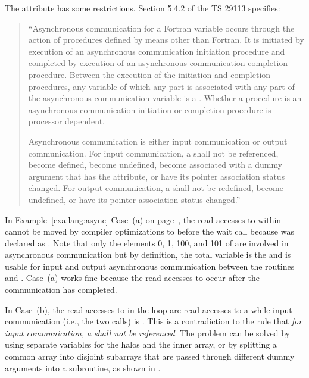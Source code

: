 The  attribute has some restrictions.
Section 5.4.2 of the TS 29113 specifies:
\begin{quote}
``Asynchronous communication for a Fortran variable occurs through the action of procedures defined by means
other than Fortran. It is initiated by execution of an asynchronous communication initiation procedure and
completed by execution of an asynchronous communication completion procedure. Between the execution of the
initiation and completion procedures, any variable of which any part is associated with any part of the
asynchronous communication variable is a . Whether a procedure is an asynchronous
communication initiation or completion procedure is processor dependent.

Asynchronous communication is either input communication or output communication. For input communication,
a  shall not be referenced, become defined, become undefined, become associated
with a dummy argument that has the  attribute, or have its pointer association status changed. For
output communication, a  shall not be redefined, become undefined, or have its
pointer association status changed.''
\end{quote}

In Example~\ref{exa:lang:async} Case~(a) on page~\pageref{exa:lang:async},
the read accesses to  within 
cannot be moved by compiler optimizations to before the wait call
because  was declared as .
Note that only the elements 0, 1, 100, and 101 of  are
involved in asynchronous communication but by definition,
the total variable  is the 
and is usable for input and output asynchronous communication
between the  routines and .
Case~(a) works fine because the read accesses to 
occur after the communication has completed.

In Case~(b), the read accesses to  in the loop 
are read accesses to a  while
input communication (i.e., the two  calls)
is .
This is a contradiction to the rule that
\emph{for input communication, a}
\emph{shall not be referenced}.
The problem can be solved by using separate variables for the halos
and the inner array,
or by splitting a common array into disjoint subarrays that are
passed through different dummy arguments into a subroutine, as shown
in .

